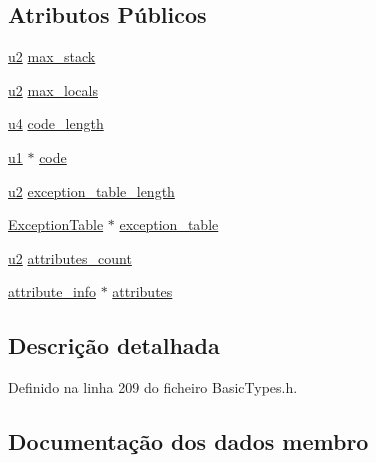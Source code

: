 \subsection*{Atributos Públicos}
\begin{DoxyCompactItemize}
\item 
\hyperlink{BasicTypes_8h_a732cde1300aafb73b0ea6c2558a7a54f}{u2} \hyperlink{structCode__attribute_a300885ff1326f01f7c86e7b4425f0d35}{max\+\_\+stack}
\item 
\hyperlink{BasicTypes_8h_a732cde1300aafb73b0ea6c2558a7a54f}{u2} \hyperlink{structCode__attribute_ad710ec86a1d37c6daa999383f8f2fd35}{max\+\_\+locals}
\item 
\hyperlink{BasicTypes_8h_ae5be1f726785414dd1b77d60df074c9d}{u4} \hyperlink{structCode__attribute_a80af47e824a13ef4dc604e5b8671f793}{code\+\_\+length}
\item 
\hyperlink{BasicTypes_8h_ad9f4cdb6757615aae2fad89dab3c5470}{u1} $\ast$ \hyperlink{structCode__attribute_a26d83aeded05528b11dd486555d1ece2}{code}
\item 
\hyperlink{BasicTypes_8h_a732cde1300aafb73b0ea6c2558a7a54f}{u2} \hyperlink{structCode__attribute_a24b063ad994d77688db7468fae11e7aa}{exception\+\_\+table\+\_\+length}
\item 
\hyperlink{structExceptionTable}{Exception\+Table} $\ast$ \hyperlink{structCode__attribute_a080b3f7a5717321484a648ec83c11f12}{exception\+\_\+table}
\item 
\hyperlink{BasicTypes_8h_a732cde1300aafb73b0ea6c2558a7a54f}{u2} \hyperlink{structCode__attribute_a9ca1435aa65ae02d764ff53a36fb842f}{attributes\+\_\+count}
\item 
\hyperlink{structattribute__info}{attribute\+\_\+info} $\ast$ \hyperlink{structCode__attribute_abb5d2d93e2f165dd908c3788a323d093}{attributes}
\end{DoxyCompactItemize}


\subsection{Descrição detalhada}


Definido na linha 209 do ficheiro Basic\+Types.\+h.



\subsection{Documentação dos dados membro}
\mbox{\label{structCode__attribute_abb5d2d93e2f165dd908c3788a323d093}} 
